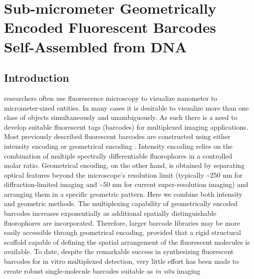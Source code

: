 
\chapter{Sub-micrometer Geometrically Encoded Fluorescent Barcodes Self-Assembled from DNA}\label{chapter:DNAbarcode}

\section{Introduction}
 researchers often use fluorescence microscopy to visualize nanometer to micrometer-sized entities. In many cases it is desirable to visualize more than one class of objects simultaneously and unambiguously. As such there is a need to develop suitable 
fluorescent tags (barcodes) for multiplexed imaging applications. Most previously 
described fluorescent barcodes are constructed using either intensity encoding \citep{han_quantum-dot-tagged_2001,xu_multiplexed_2003,li_multiplexed_2005,livet_transgenic_2007,fournier-bidoz_facile_2008,lin_self-assembled_2007,marcon_--fly_2010} or 
geometrical encoding \citep{nicewarner-pena_submicrometer_2001,gudiksen_growth_2002,braeckmans_encoding_2003,dejneka_rare_2003,geiss_direct_2008,pregibon_multifunctional_2007,xiao_direct_2009,li_controlled_2010}. Intensity encoding relies on the combination of multiple 
spectrally differentiable fluorophores in a controlled molar ratio. Geometrical encoding, 
on the other hand, is obtained by separating optical features beyond the microscope’s 
resolution limit (typically \textasciitilde250 nm for diffraction-limited imaging and \textasciitilde 50 nm for 
current super-resolution imaging) and arranging them in a specific geometric pattern.
Here we combine both intensity and geometric methods. The multiplexing capability of geometrically encoded barcodes increases 
exponentially as additional spatially distinguishable fluorophores are incorporated. 
Therefore, larger barcode libraries may be more easily accessible through geometrical 
encoding, provided that a rigid structural scaffold capable of defining the spatial 
arrangement of the fluorescent molecules is available. To date, despite the remarkable 
success in synthesizing fluorescent barcodes for in vitro multiplexed detection, very little 
effort has been made to create robust single-molecule barcodes suitable as \textit{in situ} imaging 
